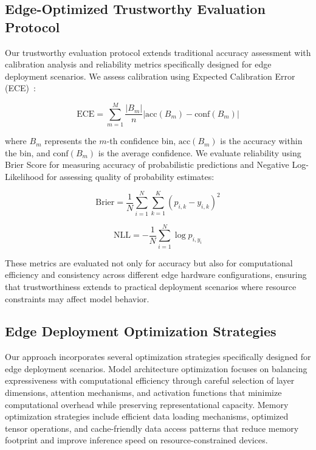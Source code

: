 \documentclass[journal]{IEEEtran}
\begin{document}
\subsection{Edge-Optimized Trustworthy Evaluation Protocol}

Our trustworthy evaluation protocol extends traditional accuracy assessment with calibration analysis and reliability metrics specifically designed for edge deployment scenarios. We assess calibration using Expected Calibration Error (ECE)~\cite{calibration_guo2017}:

\begin{equation}
\text{ECE} = \sum_{m=1}^{M} \frac{|B_m|}{n} |\text{acc}(B_m) - \text{conf}(B_m)|
\end{equation}

where $B_m$ represents the $m$-th confidence bin, $\text{acc}(B_m)$ is the accuracy within the bin, and $\text{conf}(B_m)$ is the average confidence. We evaluate reliability using Brier Score for measuring accuracy of probabilistic predictions and Negative Log-Likelihood for assessing quality of probability estimates:

\begin{equation}
\text{Brier} = \frac{1}{N} \sum_{i=1}^{N} \sum_{k=1}^{K} (p_{i,k} - y_{i,k})^2
\end{equation}

\begin{equation}
\text{NLL} = -\frac{1}{N} \sum_{i=1}^{N} \log p_{i,y_i}
\end{equation}

These metrics are evaluated not only for accuracy but also for computational efficiency and consistency across different edge hardware configurations, ensuring that trustworthiness extends to practical deployment scenarios where resource constraints may affect model behavior.

\subsection{Edge Deployment Optimization Strategies}

Our approach incorporates several optimization strategies specifically designed for edge deployment scenarios. Model architecture optimization focuses on balancing expressiveness with computational efficiency through careful selection of layer dimensions, attention mechanisms, and activation functions that minimize computational overhead while preserving representational capacity. Memory optimization strategies include efficient data loading mechanisms, optimized tensor operations, and cache-friendly data access patterns that reduce memory footprint and improve inference speed on resource-constrained devices.
\end{document}
